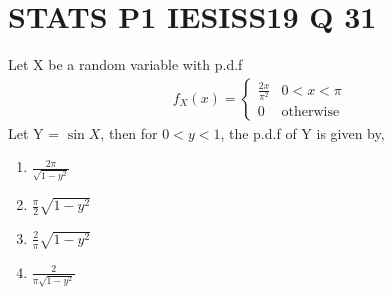 \documentclass[journal,12pt,twocolumn]{IEEEtran}
\begin{document}
\section*{STATS P1 IESISS19 Q 31}
Let X be a random variable with p.d.f
\begin{align}
    f_{X}(x)=\begin{cases} 
            \frac{2x}{\pi^2}  &  0<x<\pi\\
            0 & \text{otherwise}
            \end{cases} 
\end{align}
Let Y = $\sin{X}$, then for $0<y<1$, the p.d.f of Y is given by,\\
\begin{enumerate}[label = (\Alph*)]
    \item  $\frac{2\pi}{\sqrt{1-y^2}}$\\
    \item  $\frac{\pi}{2}\sqrt{1-y^2}$\\
    \item  $\frac{2}{\pi}\sqrt{1-y^2}$\\
    \item  $\frac{2}{\pi\sqrt{1-y^2}}$
\end{enumerate}
\end{document}
